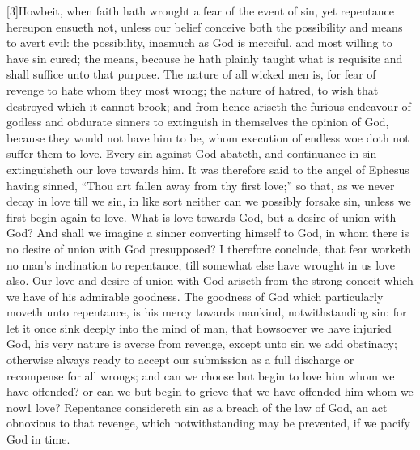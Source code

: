 [3]Howbeit, when faith hath wrought a fear of the event of sin, yet repentance hereupon ensueth not, unless our belief conceive both the possibility and means to avert evil: the possibility, inasmuch as God is merciful, and most willing to have sin cured; the means, because he hath plainly taught what is requisite and shall suffice unto that purpose. The nature of all wicked men is, for fear of revenge to hate whom they most wrong; the nature of hatred, to wish that destroyed which it cannot brook; and from hence ariseth the furious endeavour of godless and obdurate sinners to extinguish in themselves the opinion of God, because they would not have him to be, whom execution of endless woe doth not suffer them to love. Every sin against God abateth, and continuance in sin extinguisheth our love towards him. It was therefore said to the angel of Ephesus having sinned, “Thou art fallen away from thy first love;” so that, as we never decay in love till we sin, in like sort neither can we possibly forsake sin, unless we first begin again to love. What is love towards God, but a desire of union with God? And shall we imagine a sinner converting himself to God, in whom there is no desire of union with God presupposed? I therefore conclude, that fear worketh no man’s inclination to repentance, till somewhat else have wrought in us love also. Our love and desire of union with God ariseth from the strong conceit which we have of his admirable goodness. The goodness of God which particularly moveth unto repentance, is his mercy towards mankind, notwithstanding sin: for let it once sink deeply into the mind of man, that howsoever we have injuried God, his very nature is averse from revenge, except unto sin we add obstinacy; otherwise always ready to accept our submission as a full discharge or recompense for all wrongs; and can we choose but begin to love him whom we have offended? or can we but begin to grieve that we have offended him whom we now1 love? Repentance considereth sin as a breach of the law of God, an act obnoxious to that revenge, which notwithstanding may be prevented, if we pacify God in time.

